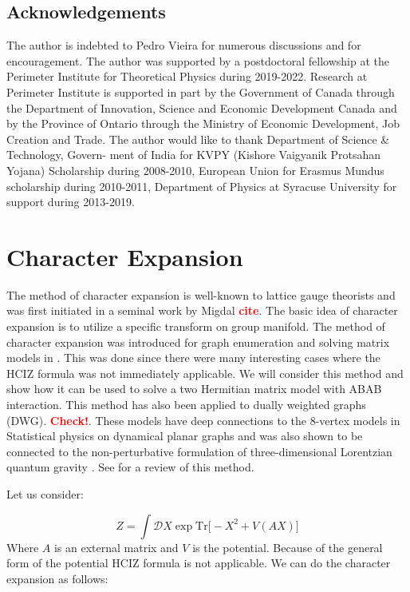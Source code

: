 \documentclass[11pt]{article}
\newcommand{\TODO}[1]{\textcolor{red}{{\bf #1}}}
\begin{document}
\subsection*{Acknowledgements}
The author is indebted to Pedro Vieira
for numerous discussions and for encouragement. 
The author was supported by a postdoctoral fellowship at the Perimeter Institute for 
Theoretical Physics during 2019-2022. Research at Perimeter Institute is supported 
in part by the Government of Canada through the Department of Innovation, Science and 
Economic Development Canada and by the Province of Ontario through 
the Ministry of Economic Development, Job Creation and Trade.
The author would like to thank Department of Science \& Technology, Govern-
ment of India for KVPY (Kishore Vaigyanik Protsahan Yojana) Scholarship during 2008-2010, 
European Union for Erasmus Mundus scholarship during 2010-2011, 
Department of Physics at Syracuse University for support during 2013-2019. 

\newpage 
\appendix


\section{Character Expansion} 
The method of character expansion is well-known to lattice gauge 
theorists and was first initiated in a seminal work by Migdal \TODO{cite}. 
The basic idea of character expansion is to utilize a specific transform 
on group manifold. The method of character expansion was introduced for 
graph enumeration and solving matrix models in
\cite{DiFrancesco:1992cn, Kazakov:1995ae}. 
This was done since there were many interesting cases 
where the HCIZ formula was not immediately applicable. 
We will consider this method and show how it can be used to solve a 
two Hermitian matrix model with ABAB interaction.
This method has also been applied to dually weighted graphs (DWG). 
\TODO{Check!}. These models have deep connections to the 8-vertex models
in Statistical physics on dynamical planar graphs 
and was also shown to be connected to 
the non-perturbative formulation of three-dimensional Lorentzian quantum gravity \cite{Ambjorn:2001br}.
See \cite{Kazakov:2000aq} for a review of this method. 

Let us consider: 

\begin{equation}
Z = \int \mathcal{D}X \exp \mbox{Tr} \Big[ -X^2 + V(AX) \Big]
\end{equation}
Where $A$ is an external matrix and $V$ is the potential. Because of the general form of the potential HCIZ formula is not applicable. We can do the character expansion as follows:
\end{document}
